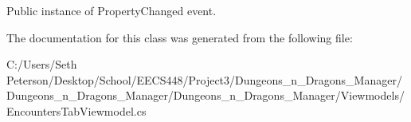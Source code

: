 Public instance of Property\+Changed event. 



The documentation for this class was generated from the following file\+:\begin{DoxyCompactItemize}
\item 
C\+:/\+Users/\+Seth Peterson/\+Desktop/\+School/\+E\+E\+C\+S448/\+Project3/\+Dungeons\+\_\+n\+\_\+\+Dragons\+\_\+\+Manager/\+Dungeons\+\_\+n\+\_\+\+Dragons\+\_\+\+Manager/\+Dungeons\+\_\+n\+\_\+\+Dragons\+\_\+\+Manager/\+Viewmodels/Encounters\+Tab\+Viewmodel.\+cs\end{DoxyCompactItemize}
